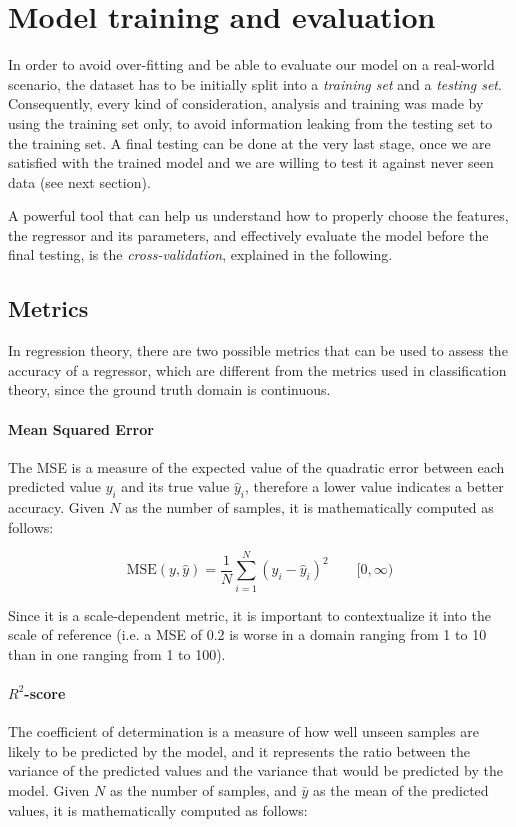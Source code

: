 \section{Model training and evaluation}\label{sec:evaluation}

In order to avoid over-fitting and be able to evaluate our model on a real-world scenario, the dataset has to be initially split into a \emph{training set} and a \emph{testing set}.
Consequently, every kind of consideration, analysis and training was made by using the training set only, to avoid information leaking from the testing set to the training set.
A final testing can be done at the very last stage, once we are satisfied with the trained model and we are willing to test it against never seen data (see next section).

A powerful tool that can help us understand how to properly choose the features, the regressor and its parameters, and effectively evaluate the model before the final testing, is the \emph{cross-validation}, explained in the following.

\subsection{Metrics}\label{sec:metrics}

In regression theory, there are two possible metrics that can be used to assess the accuracy of a regressor, which are different from the metrics used in classification theory, since the ground truth domain is continuous.

\paragraph{Mean Squared Error}
The MSE is a measure of the expected value of the quadratic error between each predicted value $y_i$ and its true value $\hat{y}_i$, therefore a lower value indicates a better accuracy.
Given $N$ as the number of samples, it is mathematically computed as follows:

\[
	\text{MSE}(y, \hat{y}) = \frac{1}{N} \sum_{i=1}^{N} (y_i - \hat{y}_i)^2
	\qquad [0, \infty)
\]

Since it is a scale-dependent metric, it is important to contextualize it into the scale of reference (i.e. a MSE of 0.2 is worse in a domain ranging from 1 to 10 than in one ranging from 1 to 100).

\paragraph{$R^2$-score}
The coefficient of determination is a measure of how well unseen samples are likely to be predicted by the model, and it represents the ratio between the variance of the predicted values and the variance that would be predicted by the model.
Given $N$ as the number of samples, and $\bar{y}$ as the mean of the predicted values, it is mathematically computed as follows:

